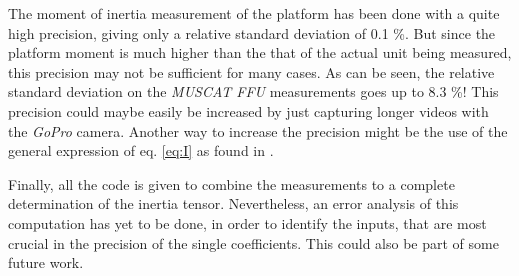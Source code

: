 \documentclass[journal]{IEEEtran}
\begin{document}
The moment of inertia measurement of the platform has been done with a quite high precision, giving only a relative standard deviation of 0.1 \%.
But since the platform moment is much higher than the that of the actual unit being measured, this precision may not be sufficient for many cases.
As can be seen, the relative standard deviation on the \emph{MUSCAT FFU} measurements goes up to 8.3 \%!
This precision could maybe easily be increased by just capturing longer videos with the \emph{GoPro} camera.
Another way to increase the precision might be the use of the general expression of eq. \ref{eq:I} as found in \cite{report:ernest}.

Finally, all the code is given to combine the measurements to a complete determination of the inertia tensor. Nevertheless, an error analysis of this computation has yet to be done, in order to identify the inputs, that are most crucial in the precision of the single coefficients. This could also be part of some future work.


%



\ifCLASSOPTIONcaptionsoff
  \newpage
\fi
\end{document}

